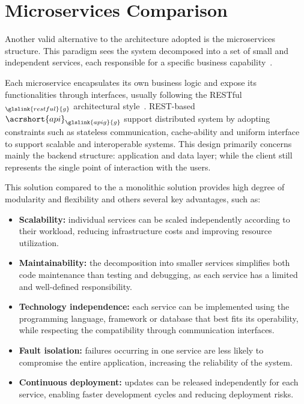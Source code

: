 \section{Microservices Comparison}

Another valid alternative to the architecture adopted is the microservices structure. This paradigm sees the system decomposed into a set of small and independent services, each responsible for a specific business capability~\cite{article:microservices-explained}.

Each microservice encapsulates its own business logic and expose its functionalities through interfaces, usually following the RESTful$_{\glslink{restful}{g}}$ architectural style~\cite{article:rest-api}. REST-based~$\acrshort{api}_{\glslink{apig}{g}}$ support distributed system by adopting constraints such as  stateless communication, cache-ability and uniform interface to support scalable and interoperable systems. This design primarily concerns mainly the backend structure: application and data layer; while the client still represents the single point of interaction with the users.

This solution compared to the a monolithic solution provides high degree of modularity and flexibility and others several key advantages, such as:

\begin{itemize}
    \item \textbf{Scalability:} individual services can be scaled independently according to their workload, reducing infrastructure costs and improving resource utilization.
    
    \item \textbf{Maintainability:} the decomposition into smaller services simplifies both code maintenance than testing and debugging, as each service has a limited and well-defined responsibility.
    
    \item \textbf{Technology independence:} each service can be implemented using the programming language, framework or database that best fits its operability, while respecting the compatibility through communication interfaces.
    
    \item \textbf{Fault isolation:} failures occurring in one service are less likely to compromise the entire application, increasing the reliability of the system.
    
    \item \textbf{Continuous deployment:} updates can be released independently for each service, enabling faster development cycles and reducing deployment risks.
\end{itemize}

